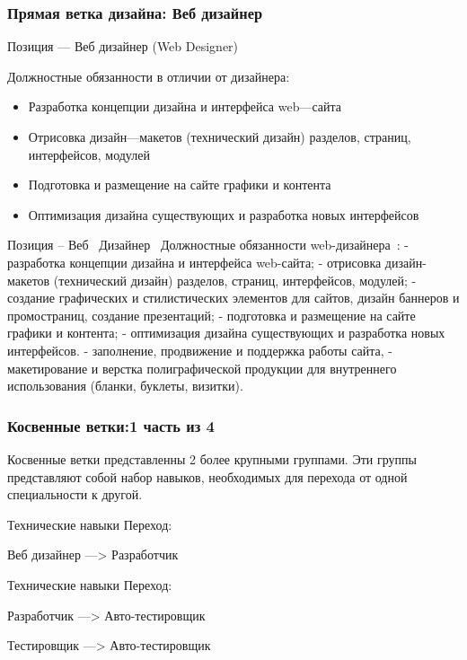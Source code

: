 \documentclass{../industrial-development}
\begin{document}
{\begin{frame} \frametitle{Прямая ветка дизайна: Веб дизайнер }
 \begin{block}{}
  \alert{Позиция --- Веб дизайнер (Web Designer)}

Должностные обязанности в отличии от дизайнера: 
  \end{block}
  \begin{itemize}
  \item   Разработка концепции дизайна и интерфейса web---сайта
  \item  Отрисовка дизайн---макетов (технический дизайн) разделов, страниц, интерфейсов, модулей
  \item Подготовка и размещение на сайте графики и контента
 \item Оптимизация дизайна существующих и разработка новых интерфейсов
  \end{itemize}
\end{frame}

\lecturenotes
Позиция – Веб~\cite{hh} Дизайнер~\cite{itcf}
Должностные обязанности web-дизайнера~\cite{rab}:
- разработка концепции дизайна и интерфейса web-сайта;
- отрисовка дизайн-макетов (технический дизайн) разделов, страниц, интерфейсов, модулей;
- создание графических и стилистических элементов для сайтов, дизайн баннеров и промостраниц, создание презентаций;
- подготовка и размещение на сайте графики и контента;
- оптимизация дизайна существующих и разработка новых интерфейсов.
- заполнение, продвижение и поддержка работы сайта,
- макетирование и верстка полиграфической продукции для внутреннего использования (бланки, буклеты, визитки).

\begin{frame} \frametitle{Косвенные ветки:1 часть из 4}
 \begin{block}{}
Косвенные ветки представленны 2 более крупными группами. Эти группы представляют собой набор навыков, необходимых для перехода от одной специальности к другой.
  \end{block}
  
\begin{block}{}
 \alert{Технические навыки} Переход: 

Веб дизайнер ---> Разработчик
  \end{block}

 \begin{block}{}
 \alert{Технические навыки} Переход: 

 Разработчик ---> Авто-тестировщик 

 Тестировщик --->  Авто-тестировщик
  \end{block}
\end{frame}


}
\end{document}
